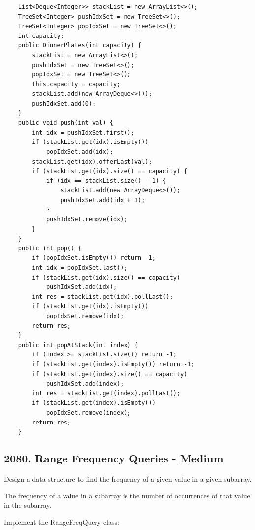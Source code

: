 \documentclass[9pt, b5paaper]{book}
\begin{document}
\begin{verbatim}
    List<Deque<Integer>> stackList = new ArrayList<>();
    TreeSet<Integer> pushIdxSet = new TreeSet<>();
    TreeSet<Integer> popIdxSet = new TreeSet<>();
    int capacity;
    public DinnerPlates(int capacity) {
        stackList = new ArrayList<>();
        pushIdxSet = new TreeSet<>();
        popIdxSet = new TreeSet<>();
        this.capacity = capacity;
        stackList.add(new ArrayDeque<>());
        pushIdxSet.add(0);
    }
    public void push(int val) {
        int idx = pushIdxSet.first();
        if (stackList.get(idx).isEmpty()) 
            popIdxSet.add(idx);
        stackList.get(idx).offerLast(val);
        if (stackList.get(idx).size() == capacity) {
            if (idx == stackList.size() - 1) {
                stackList.add(new ArrayDeque<>());
                pushIdxSet.add(idx + 1);
            }
            pushIdxSet.remove(idx);
        }
    }
    public int pop() {
        if (popIdxSet.isEmpty()) return -1;
        int idx = popIdxSet.last();
        if (stackList.get(idx).size() == capacity)
            pushIdxSet.add(idx);
        int res = stackList.get(idx).pollLast();
        if (stackList.get(idx).isEmpty())
            popIdxSet.remove(idx);
        return res;
    }
    public int popAtStack(int index) {
        if (index >= stackList.size()) return -1;
        if (stackList.get(index).isEmpty()) return -1;
        if (stackList.get(index).size() == capacity)
            pushIdxSet.add(index);
        int res = stackList.get(index).pollLast();
        if (stackList.get(index).isEmpty()) 
            popIdxSet.remove(index);
        return res;
    }
\end{verbatim}

\subsection{2080. Range Frequency Queries - Medium}
\label{sec-7-0-5}
Design a data structure to find the frequency of a given value in a given subarray.

The frequency of a value in a subarray is the number of occurrences of that value in the subarray.

Implement the RangeFreqQuery class:
\end{document}
